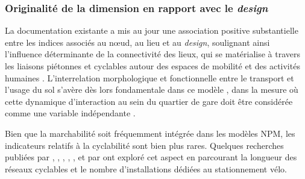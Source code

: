 \begin{refsegment}
\subsubsection*{Originalité de la dimension en rapport avec le \textsl{design}
    \label{chap6:indicateurs-accessibility-originalite}
    }

La documentation existante a mis au jour une association positive substantielle entre les indices associés au nœud, au lieu et au \textsl{design}, soulignant ainsi l'influence déterminante de la connectivité des lieux, qui se matérialise à travers les liaisons piétonnes et cyclables autour des espaces de mobilité et des activités humaines \textcolor{blue}{\autocite[4-5]{zhang_make_2023}}. L'interrelation morphologique et fonctionnelle entre le transport et l'usage du sol s'avère dès lors fondamentale dans ce modèle \textcolor{blue}{\autocite[271]{li_transit_2019}}, dans la mesure où cette dynamique d'interaction au sein du quartier de gare doit être considérée comme une variable indépendante \textcolor{blue}{\autocite[20]{peek_gaining_2006}}.%

Bien que la marchabilité soit fréquemment intégrée dans les modèles \acrshort{NPM}, les indicateurs relatifs à la cyclabilité sont bien plus rares. Quelques recherches publiées par \textcolor{blue}{\textcite[195]{reusser_classifying_2008}}, \textcolor{blue}{\textcite[26]{lukman_development_2014}}, \textcolor{blue}{\textcite[312]{huang_measuring_2018}}, \textcolor{blue}{\textcite[1~018]{maheshwari_evaluating_2022}}, \textcolor{blue}{\textcite[10]{arliani_measuring_2023}}, \textcolor{blue}{\textcite[6]{zhang_make_2023}} et par \textcolor{blue}{\textcite[82]{robillard_transit-oriented_2024}} ont exploré cet aspect en parcourant la longueur des réseaux cyclables et le nombre d'installations dédiées au stationnement vélo.%


\end{refsegment}
